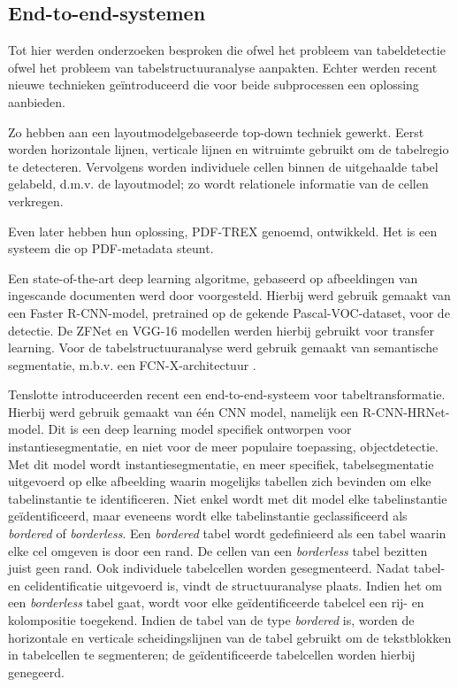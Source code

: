 \subsection{End-to-end-systemen}
\label{subssec:end-to-end-systemen}

Tot hier werden onderzoeken besproken die ofwel het probleem van tabeldetectie ofwel het probleem van tabelstructuuranalyse aanpakten. Echter werden recent nieuwe technieken geïntroduceerd die voor beide subprocessen een oplossing aanbieden.

Zo hebben \textcite{Green1996} aan een layoutmodelgebaseerde top-down techniek gewerkt. Eerst worden horizontale lijnen, verticale lijnen en witruimte gebruikt om de tabelregio te detecteren. Vervolgens worden individuele cellen binnen de uitgehaalde tabel gelabeld, d.m.v. de layoutmodel; zo wordt relationele informatie van de cellen verkregen.

Even later hebben \textcite{Oro2009} hun oplossing, PDF-TREX genoemd, ontwikkeld. Het is een systeem die op PDF-metadata steunt.

Een state-of-the-art deep learning algoritme, gebaseerd op afbeeldingen van ingescande documenten werd door \textcite{Schreiber2017} voorgesteld. Hierbij werd gebruik gemaakt van een Faster R-CNN-model, pretrained op de gekende Pascal-VOC-dataset, voor de detectie. De ZFNet \autocite{Zeiler2014} en VGG-16 \autocite{Simonyan2014} modellen werden hierbij gebruikt voor transfer learning. Voor de tabelstructuuranalyse werd gebruik gemaakt van semantische segmentatie, m.b.v. een FCN-X-architectuur \autocite{Shelhamer2017}.

Tenslotte introduceerden \textcite{Prasad2020} recent een end-to-end-systeem voor tabeltransformatie. Hierbij werd gebruik gemaakt van één \Gls{CNN} model, namelijk een R-CNN-HRNet-model. Dit is een deep learning model specifiek ontworpen voor instantiesegmentatie, en niet voor de meer populaire toepassing, objectdetectie. Met dit model wordt instantiesegmentatie, en meer specifiek, tabelsegmentatie uitgevoerd op elke afbeelding waarin mogelijks tabellen zich bevinden om elke tabelinstantie te identificeren. Niet enkel wordt met dit model elke tabelinstantie geïdentificeerd, maar eveneens wordt elke tabelinstantie geclassificeerd als \textit{bordered} of \textit{borderless}. Een \textit{bordered} tabel wordt gedefinieerd als een tabel waarin elke cel omgeven is door een rand. De cellen van een \textit{borderless} tabel bezitten juist geen rand. Ook individuele tabelcellen worden gesegmenteerd. Nadat tabel- en celidentificatie uitgevoerd is, vindt de structuuranalyse plaats. Indien het om een \textit{borderless} tabel gaat, wordt voor elke geïdentificeerde tabelcel een rij- en kolompositie toegekend. Indien de tabel van de type \textit{bordered} is, worden de horizontale en verticale scheidingslijnen van de tabel gebruikt om de tekstblokken in tabelcellen te segmenteren; de geïdentificeerde tabelcellen worden hierbij genegeerd.

